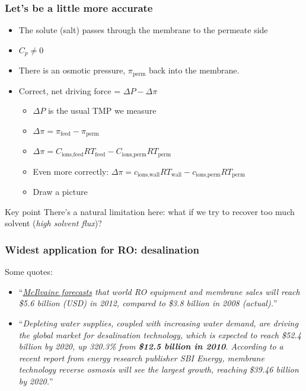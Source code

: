 \begin{frame}\frametitle{Let's be a little more accurate}
	\begin{itemize}
		\item	The solute (salt) passes through the membrane to the permeate side
		\item	$C_p \neq 0$
		\item	There is an osmotic pressure, $\pi_\text{perm}$ back into the membrane.
		\item	Correct, net driving force = $\Delta P - \Delta \pi$
		\begin{itemize}
			\item	$\Delta P$ is the usual TMP we measure
			\item	$\Delta \pi = \pi_\text{feed} - \pi_\text{perm}$
			\item	$\Delta \pi = C_\text{ions,feed}RT_\text{feed} - C_\text{ions,perm}RT_\text{perm}$
			\item	Even more correctly: $\Delta \pi = c_\text{ions,wall}RT_\text{wall} - c_\text{ions,perm}RT_\text{perm}$
			\item	{\color{myOrange}Draw a picture}
		\end{itemize}
	\end{itemize}
	
	\vspace{12pt}
	\begin{exampleblock}{Key point}
		There's a natural limitation here: what if we try to recover too much solvent (\emph{high solvent flux})?
	\end{exampleblock}
\end{frame}

\begin{frame}\frametitle{Widest application for RO: desalination}
	Some quotes:
	\begin{itemize}
		\item	``\emph{\href{http://www.sciencedirect.com/science/article/pii/S0958211809701053}{McIlvaine forecasts} that world RO equipment and membrane sales will reach \$5.6 billion (USD) in 2012, compared to \$3.8 billion in 2008 (actual).}''
		\item	``\emph{Depleting water supplies, coupled with increasing water demand, are driving the global market for desalination technology, which is expected to reach \$52.4 billion by 2020, up 320.3\% from \textbf{\$12.5 billion in 2010}. According to a recent report from energy research publisher SBI Energy, membrane technology reverse osmosis will see the largest growth, reaching \$39.46 billion by 2020.}''
	\end{itemize}
\end{frame}

